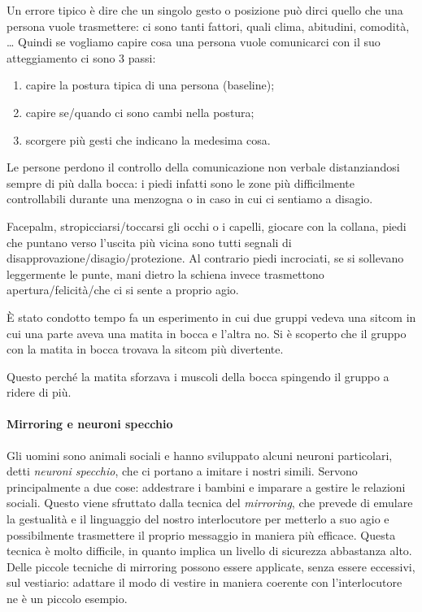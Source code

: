 \noindent Un errore tipico è dire che un singolo gesto o posizione può dirci
quello che una persona vuole trasmettere: ci sono tanti fattori, quali clima,
abitudini, comodità, \dots{} Quindi se vogliamo capire cosa una persona vuole
comunicarci con il suo atteggiamento ci sono 3 passi:
\begin{enumerate}
\item capire la postura tipica di una persona (baseline);
\item capire se/quando ci sono cambi nella postura;
\item scorgere più gesti che indicano la medesima cosa.
\end{enumerate}
Le persone perdono il controllo della comunicazione non verbale
distanziandosi sempre di più dalla bocca: i piedi infatti sono le zone più
difficilmente controllabili durante una menzogna o in caso in cui ci sentiamo a
disagio.

Facepalm, stropicciarsi/toccarsi gli occhi o i capelli, giocare con la collana,
piedi che puntano verso l'uscita più vicina sono tutti segnali di
disapprovazione/disagio/protezione. Al contrario piedi incrociati, se si
sollevano leggermente le punte, mani dietro la schiena invece trasmettono
apertura/felicità/che ci si sente a proprio agio.

\begin{example}
È stato condotto tempo fa un esperimento in cui due gruppi vedeva una sitcom
in cui una parte aveva una matita in bocca e l'altra no. Si è scoperto che il
gruppo con la matita in bocca trovava la sitcom più divertente.

\noindent Questo perché la matita sforzava i muscoli della bocca spingendo il
gruppo a ridere di più.
\end{example}

\paragraph*{Mirroring e neuroni specchio}
Gli uomini sono animali sociali e hanno sviluppato alcuni neuroni particolari,
detti \emph{neuroni specchio}, che ci portano a imitare i nostri simili.
Servono principalmente a due cose: addestrare i bambini e imparare a gestire le
relazioni sociali. Questo viene sfruttato dalla tecnica del \emph{mirroring},
che prevede di emulare la gestualità e il linguaggio del nostro interlocutore
per metterlo a suo agio e possibilmente trasmettere il proprio messaggio in
maniera più efficace. Questa tecnica è molto difficile, in quanto implica un
livello di sicurezza abbastanza alto. Delle piccole tecniche di mirroring
possono essere applicate, senza essere eccessivi, sul vestiario: adattare il
modo di vestire in maniera coerente con l'interlocutore ne è un piccolo esempio.
